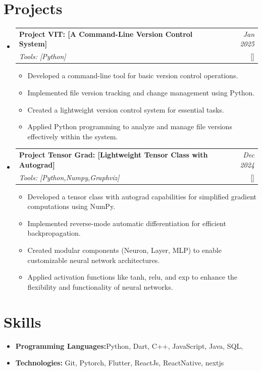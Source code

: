 \documentclass[a4paper,11pt]{article}
\makeatletter
\newcommand{\resumeItem}[2]{
  \item{
    \textbf{#1}{\hspace{0.5mm}#2 \vspace{-0.5mm}}
  }
}
\newcommand{\resumeProject}[4]{
\vspace{0.5mm}\item
    \begin{tabular*}{0.98\textwidth}[t]{l@{\extracolsep{\fill}}r}
        \textbf{#1} & \textit{\footnotesize{#3}} \\
        \footnotesize{\textit{#2}} & \footnotesize{#4}
    \end{tabular*}
    \vspace{-2.4mm}
}
\newcommand{\resumeSubItem}[2]{\resumeItem{#1}{#2}\vspace{-4pt}}
\newcommand{\resumeSubHeadingListStart}{\begin{itemize}[leftmargin=*,labelsep=1mm]}
\newcommand{\resumeHeadingSkillStart}{\begin{itemize}[leftmargin=*,itemsep=1.7mm, rightmargin=2ex]}
\newcommand{\resumeItemListStart}{\begin{itemize}[leftmargin=*,labelsep=1mm,itemsep=0.5mm]}
\newcommand{\resumeSubHeadingListEnd}{\end{itemize}\vspace{2mm}}
\newcommand{\resumeHeadingSkillEnd}{\end{itemize}\vspace{-2mm}}
\newcommand{\resumeItemListEnd}{\end{itemize}\vspace{-2mm}}
\makeatother
\begin{document}
\section{\textbf{Projects}}
\vspace{-0.4mm}
\resumeSubHeadingListStart
\resumeProject
  {Project VIT: [A Command-Line Version Control System]}
  {Tools: [Python]}
  {Jan 2025}
  {{}[\href{https://github.com/imaditya123/VIT}{\textcolor{black}{\faGithub}}]}
\resumeItemListStart
  \item Developed a command-line tool for basic version control operations.
  \item Implemented file version tracking and change management using Python.
  \item Created a lightweight version control system for essential tasks.
  \item Applied Python programming to analyze and manage file versions effectively within the system.
\resumeItemListEnd
\resumeProject
  {Project Tensor Grad: [Lightweight Tensor Class with Autograd]}
  {Tools: [Python,Numpy,Graphviz]}
  {Dec 2024}
  {{}[\href{https://github.com/imaditya123/tensor_grad}{\textcolor{black}{\faGithub}}]}
\resumeItemListStart
  \item Developed a tensor class with autograd capabilities for simplified gradient computations using NumPy.
  \item Implemented reverse-mode automatic differentiation for efficient backpropagation.
  \item Created modular components (Neuron, Layer, MLP) to enable customizable neural network architectures.
  \item Applied activation functions like tanh, relu, and exp to enhance the flexibility and functionality of neural networks.
\resumeItemListEnd
\resumeSubHeadingListEnd


\vspace{-4mm}
\section{\textbf{Skills}}
\vspace{-0.4mm}
 \resumeHeadingSkillStart
  \resumeSubItem{Programming Languages:}
    {Python, Dart, C++, JavaScript, Java,  SQL,}
  \resumeSubItem{Technologies:}
    { Git, Pytorch, Flutter, ReactJs, ReactNative, nextjs}
 \resumeHeadingSkillEnd
\end{document}
